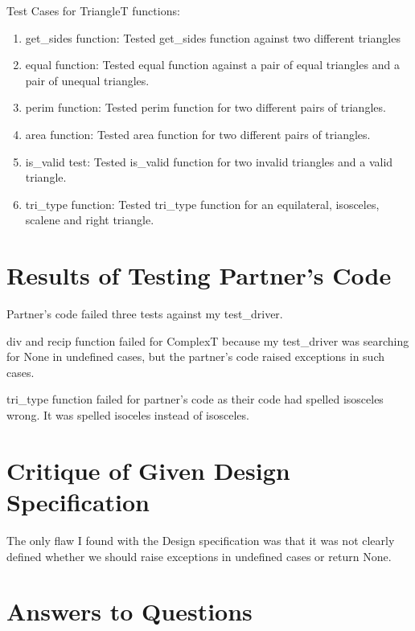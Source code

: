 \documentclass[12pt]{article}
\begin{document}
\noindent Test Cases for TriangleT functions:

\begin{enumerate}

\item get\_sides function: Tested get\_sides function against two different triangles

\item equal function: Tested equal function against a pair of equal triangles and a pair of unequal triangles.

\item perim function: Tested perim function for two different pairs of triangles.

\item area function: Tested area function for two different pairs of triangles.

\item is\_valid test: Tested is\_valid function for two invalid triangles and a valid triangle.

\item tri\_type function: Tested tri\_type function for an equilateral, isosceles, scalene and right triangle.

\end{enumerate}

\section{Results of Testing Partner's Code}

Partner's code failed three tests against my test\_driver. 

div and recip function failed for ComplexT because my test\_driver was searching for None in undefined cases, but the partner's code raised exceptions in such cases. 

tri\_type function failed for partner's code as their code had spelled isosceles wrong. It was spelled isoceles instead of isosceles.

\section{Critique of Given Design Specification}

The only flaw I found with the Design specification was that it was not clearly defined whether we should raise exceptions in undefined cases or return None.

\section{Answers to Questions}
\end{document}
